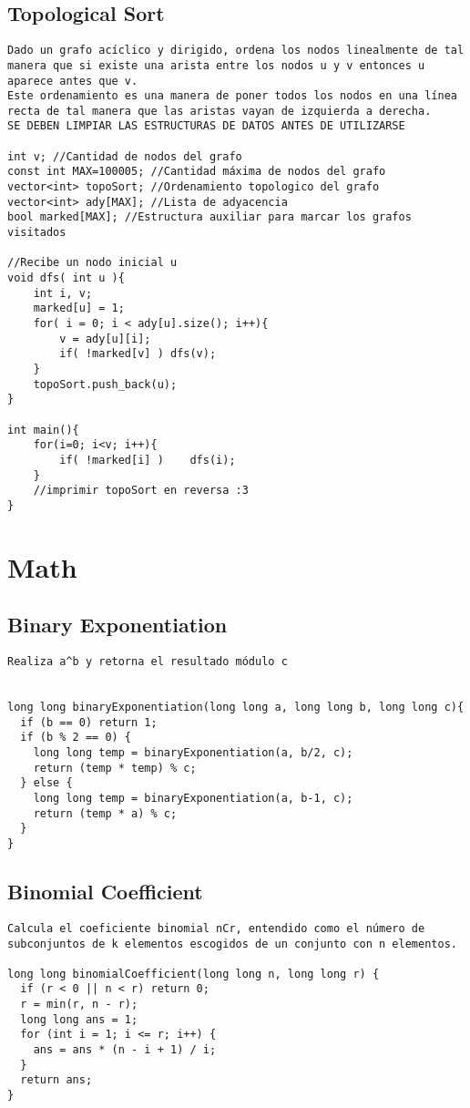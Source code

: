 \documentclass[10pt,letterpaper,twocolumn,twosided]{article}
\begin{document}
\subsection{Topological Sort}
\begin{lstlisting}
Dado un grafo acíclico y dirigido, ordena los nodos linealmente de tal manera que si existe una arista entre los nodos u y v entonces u aparece antes que v.
Este ordenamiento es una manera de poner todos los nodos en una línea recta de tal manera que las aristas vayan de izquierda a derecha.
SE DEBEN LIMPIAR LAS ESTRUCTURAS DE DATOS ANTES DE UTILIZARSE

int v; //Cantidad de nodos del grafo
const int MAX=100005; //Cantidad máxima de nodos del grafo
vector<int> topoSort; //Ordenamiento topologico del grafo
vector<int> ady[MAX]; //Lista de adyacencia
bool marked[MAX]; //Estructura auxiliar para marcar los grafos visitados

//Recibe un nodo inicial u
void dfs( int u ){
	int i, v;
	marked[u] = 1;
	for( i = 0; i < ady[u].size(); i++){
		v = ady[u][i];
		if( !marked[v] ) dfs(v);
	}
	topoSort.push_back(u);
}

int main(){
	for(i=0; i<v; i++){
		if( !marked[i] )	dfs(i);
	}
	//imprimir topoSort en reversa :3
}

\end{lstlisting}

\section{Math}

\subsection{Binary Exponentiation}
\begin{lstlisting}
Realiza a^b y retorna el resultado módulo c


long long binaryExponentiation(long long a, long long b, long long c){
  if (b == 0) return 1;
  if (b % 2 == 0) {
    long long temp = binaryExponentiation(a, b/2, c);
    return (temp * temp) % c;
  } else {
    long long temp = binaryExponentiation(a, b-1, c);
    return (temp * a) % c;
  }
}
\end{lstlisting}

\subsection{Binomial Coefficient}
\begin{lstlisting}
Calcula el coeficiente binomial nCr, entendido como el número de subconjuntos de k elementos escogidos de un conjunto con n elementos.

long long binomialCoefficient(long long n, long long r) {
  if (r < 0 || n < r) return 0;
  r = min(r, n - r);
  long long ans = 1;
  for (int i = 1; i <= r; i++) {
    ans = ans * (n - i + 1) / i;
  }
  return ans;
}\end{lstlisting}
\end{document}
